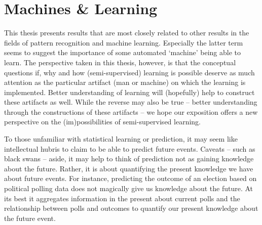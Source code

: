 \documentclass[twoside]{memoir}\usepackage[]{graphicx}\usepackage{xcolor}
\renewcommand{\cite}{\citep}
\begin{document}
\section{Machines \& Learning}
This thesis presents results that are most closely related to other results in the fields of pattern recognition and machine learning. Especially the latter term seems to suggest the importance of some automated `machine' being able to learn. The perspective taken in this thesis, however, is that the conceptual questions if, why and how (semi-supervised) learning is possible deserve as much attention as the particular artifact (man or machine) on which the learning is implemented. Better understanding of learning will (hopefully) help  to construct these artifacts as well. While the reverse may also be true -- better understanding through the constructions of these artifacts -- we hope our exposition offers a new perspective on the (im)possibilities of semi-supervised learning.

To those unfamiliar with statistical learning or prediction, it may seem like intellectual hubris to claim to be able to predict future events. Caveats -- such as black swans -- aside, it may help to think of prediction not as gaining knowledge about the future. Rather, it is about quantifying the present knowledge we have about future events. For instance, predicting the outcome of an election based on political polling data does not magically give us knowledge about the future. At its best it aggregates information in the present about current polls and the relationship between polls and outcomes to quantify our present knowledge about the future event.

\end{document}
